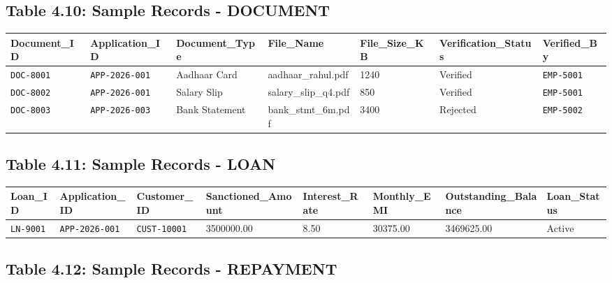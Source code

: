 \documentclass[12pt,a4paper,oneside]{report}
\begin{document}
\subsection{Table 4.10: Sample Records - DOCUMENT}

\begin{table}[htbp]
\centering
\small
\begin{tabularx}{\textwidth}{p{2.5cm} X X X X X X}
\toprule
\textbf{Document\_ID} & \textbf{Application\_ID} & \textbf{Document\_Type} & \textbf{File\_Name} & \textbf{File\_Size\_KB} & \textbf{Verification\_Status} & \textbf{Verified\_By} \\
\midrule
\texttt{DOC-8001} & \texttt{APP-2026-001} & Aadhaar Card & aadhaar\_rahul.pdf & 1240 & Verified & \texttt{EMP-5001} \\
\texttt{DOC-8002} & \texttt{APP-2026-001} & Salary Slip & salary\_slip\_q4.pdf & 850 & Verified & \texttt{EMP-5001} \\
\texttt{DOC-8003} & \texttt{APP-2026-003} & Bank Statement & bank\_stmt\_6m.pdf & 3400 & Rejected & \texttt{EMP-5002} \\
\bottomrule
\end{tabularx}
\end{table}

\subsection{Table 4.11: Sample Records - LOAN}

\begin{table}[htbp]
\centering
\small
\begin{tabularx}{\textwidth}{p{2.5cm} X X X X X X X}
\toprule
\textbf{Loan\_ID} & \textbf{Application\_ID} & \textbf{Customer\_ID} & \textbf{Sanctioned\_Amount} & \textbf{Interest\_Rate} & \textbf{Monthly\_EMI} & \textbf{Outstanding\_Balance} & \textbf{Loan\_Status} \\
\midrule
\texttt{LN-9001} & \texttt{APP-2026-001} & \texttt{CUST-10001} & 3500000.00 & 8.50 & 30375.00 & 3469625.00 & Active \\
\bottomrule
\end{tabularx}
\end{table}

\subsection{Table 4.12: Sample Records - REPAYMENT}
\end{document}
